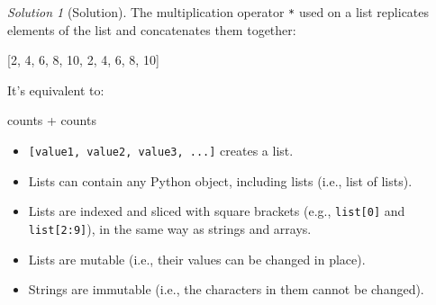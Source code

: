 \documentclass[
  letterpaper,
  DIV=11,
  numbers=noendperiod]{scrartcl}
\newenvironment{Shaded}{\begin{snugshade}}{\end{snugshade}}
\newcommand{\NormalTok}[1]{\textcolor[rgb]{0.00,0.23,0.31}{#1}}
\newcommand{\OperatorTok}[1]{\textcolor[rgb]{0.37,0.37,0.37}{#1}}
\providecommand{\tightlist}{%
  \setlength{\itemsep}{0pt}\setlength{\parskip}{0pt}}
\theoremstyle{remark}
\newtheorem*{solution}{Solution}
\begin{document}
\begin{solution}[Solution]
The multiplication operator \texttt{*} used on a list replicates
elements of the list and concatenates them together:

\begin{Shaded}
\begin{Highlighting}[]
\NormalTok{[2, 4, 6, 8, 10, 2, 4, 6, 8, 10]}
\end{Highlighting}
\end{Shaded}

It's equivalent to:

\begin{Shaded}
\begin{Highlighting}[]
\NormalTok{counts }\OperatorTok{+}\NormalTok{ counts}
\end{Highlighting}
\end{Shaded}

\end{solution}

\begin{itemize}
\tightlist
\item
  \texttt{{[}value1,\ value2,\ value3,\ ...{]}} creates a list.
\item
  Lists can contain any Python object, including lists (i.e., list of
  lists).
\item
  Lists are indexed and sliced with square brackets (e.g.,
  \texttt{list{[}0{]}} and \texttt{list{[}2:9{]}}), in the same way as
  strings and arrays.
\item
  Lists are mutable (i.e., their values can be changed in place).
\item
  Strings are immutable (i.e., the characters in them cannot be
  changed).
\end{itemize}
\end{document}
